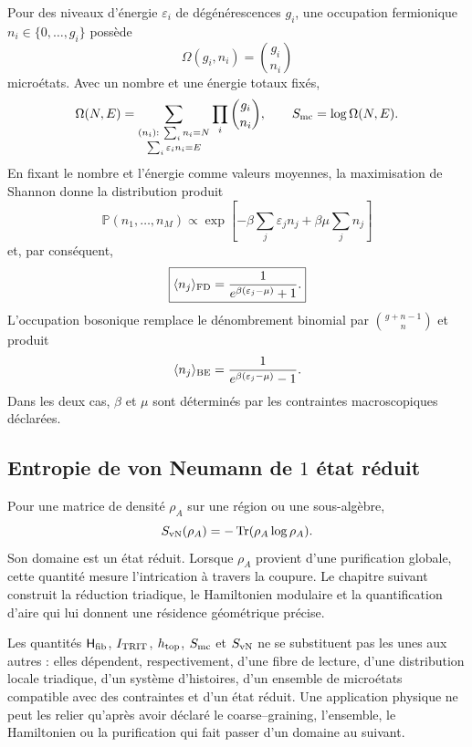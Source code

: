 Pour des niveaux d'énergie \(\varepsilon_i\) de dégénérescences \(g_i\), une
occupation fermionique \(n_i\in\{0,\ldots,g_i\}\) possède
\[
 \Omega(g_i,n_i)=\binom{g_i}{n_i}
\]
microétats. Avec un nombre et une énergie totaux fixés,
\begin{equation}
 \Omega(N,E)=
 \sum_{\substack{(n_i):\ \sum_i n_i=N\\
                         \sum_i\varepsilon_i n_i=E}}
 \prod_i\binom{g_i}{n_i},
 \qquad
 S_{\rm mc}=\log\Omega(N,E).
 \label{eq:entropia-microcanonica-anexo}
\end{equation}
En fixant le nombre et l'énergie comme valeurs moyennes, la maximisation de Shannon
\cite{Shannon1948} donne
la distribution produit
\[
 \mathbb P(n_1,\ldots,n_M)
 \propto
 \exp\!\left[-\beta\sum_j\varepsilon_jn_j
              +\beta\mu\sum_j n_j\right]
\]
et, par conséquent,
\begin{equation}
 \boxed{
 \langle n_j\rangle_{\rm FD}
 =\frac{1}{e^{\beta(\varepsilon_j-\mu)}+1}.}
 \label{eq:fermi-dirac-entropia-anexo}
\end{equation}
L'occupation bosonique remplace le dénombrement binomial par
\(\binom{g+n-1}{n}\) et produit
\[
 \langle n_j\rangle_{\rm BE}
 =\frac{1}{e^{\beta(\varepsilon_j-\mu)}-1}.
\]
Dans les deux cas, \(\beta\) et \(\mu\) sont déterminés par les contraintes
macroscopiques déclarées.

\subsection{Entropie de von Neumann de \(1\) état réduit}

Pour une matrice de densité \(\rho_A\) sur une région ou une sous-algèbre,
\[
 S_{\rm vN}(\rho_A)=-\operatorname{Tr}(\rho_A\log\rho_A).
\]
Son domaine est un état réduit. Lorsque \(\rho_A\) provient d'une
purification globale, cette quantité mesure l'intrication à travers la coupure.
Le chapitre suivant construit la réduction triadique, le Hamiltonien modulaire
et la quantification d'aire qui lui donnent une résidence géométrique précise.

\begin{proposition}
\label{prop:cinco-entropias-tipadas}
Les quantités \(\mathsf H_{\rm fib}\), \(I_{\rm TRIT}\), \(h_{\rm top}\),
\(S_{\rm mc}\) et \(S_{\rm vN}\) ne se substituent pas les unes aux autres : elles dépendent,
respectivement, d'une fibre de lecture, d'une distribution locale triadique, d'un
système d'histoires, d'un ensemble de microétats compatible avec des contraintes
et d'un état réduit. Une application physique ne peut les relier qu'après avoir
déclaré le coarse--graining, l'ensemble, le Hamiltonien ou la purification
qui fait passer d'un domaine au suivant.
\end{proposition}

